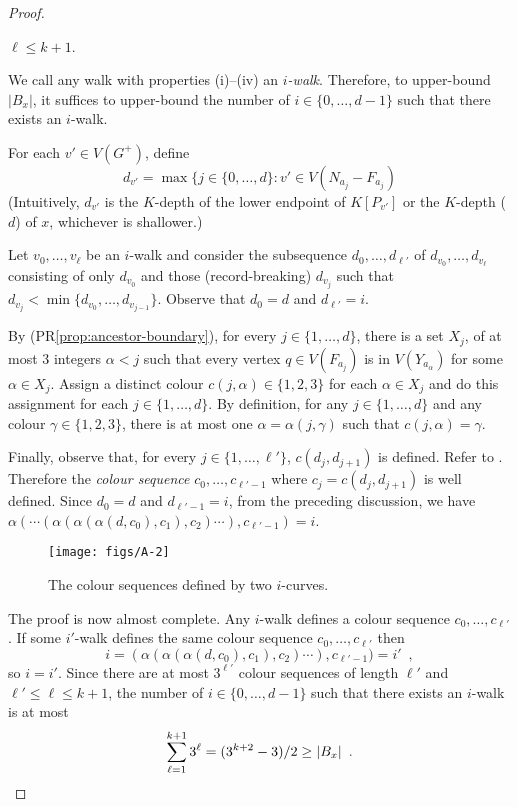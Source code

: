 \documentclass{patmorin}
\renewcommand{\propref}[1]{(PR\ref{prop:#1})}
\begin{document}
\begin{proof}
\begin{compactenum}[(i)]
    \item $\ell\le k+1$.
  \end{compactenum}
  We call any walk with properties (i)--(iv) an \emph{$i$-walk}. Therefore, to upper-bound $|B_x|$, it suffices to upper-bound the number of $i\in\{0,\ldots,d-1\}$ such that there exists an $i$-walk.
  
  For each $v'\in V(G^+)$, define
  \[  
      d_{v'}=\max\{j\in\{0,\ldots,d\} : v'\in V(N_{a_j}-F_{a_j})
  \]
  (Intuitively, $d_{v'}$ is the $K$-depth of the lower endpoint of $K[P_{v'}]$ or the $K$-depth ($d$) of $x$, whichever is shallower.)
     
  Let $v_0,\ldots,v_\ell$ be an $i$-walk and consider the subsequence $d_0,\ldots,d_{\ell'}$ of $d_{v_0},\ldots,d_{v_\ell}$ consisting of only $d_{v_0}$ and those (record-breaking) $d_{v_j}$ such that $d_{v_j}<\min\{d_{v_0},\ldots,d_{v_{j-1}}\}$.  Observe that $d_0=d$ and $d_{\ell'}=i$.
  
  By \propref{ancestor-boundary}, for every $j\in\{1,\ldots,d\}$, there is a set $X_{j}$, of at most 3 integers $\alpha < j$ such that every vertex $q\in V(F_{a_j})$ is in $V(Y_{a_{\alpha}})$ for some $\alpha\in X_j$.
  Assign a distinct colour $c(j,\alpha)\in\{1,2,3\}$ for each $\alpha\in X_j$ and do this assignment for each $j\in\{1,\ldots,d\}$.  By definition, for any $j\in\{1,\ldots,d\}$ and any colour $\gamma\in\{1,2,3\}$, there is at most one $\alpha=\alpha(j,\gamma)$ such that $c(j,\alpha)=\gamma$.
  
  Finally, observe that, for every $j\in\{1,\ldots,\ell'\}$,  $c(d_j,d_{j+1})$ is defined.  Refer to . Therefore the \emph{colour sequence} $c_0,\ldots,c_{\ell'-1}$ where $c_j=c(d_j,d_{j+1})$ is well defined.  Since $d_0=d$ and $d_{\ell'-1}=i$, from the preceding discussion, we have $\alpha(\cdots (\alpha(\alpha(\alpha(d,c_0),c_1),c_2)\cdots),c_{\ell'-1}) = i$.

  \begin{figure}
    \begin{center}
        \texttt{[image: figs/A-2]}
    \end{center}
    \caption{The colour sequences defined by two $i$-curves.}
  \end{figure}

  The proof is now almost complete.  Any $i$-walk defines a colour sequence $c_0,\ldots,c_{\ell'}$.  If some $i'$-walk defines the same colour sequence $c_0,\ldots,c_{\ell'}$ then
  \[
        i = (\alpha(\alpha(\alpha(d,c_0),c_1),c_2)\cdots),c_{\ell'-1}) = i' \enspace ,
  \]
  so $i=i'$.  Since there are at most $3^{\ell'}$ colour sequences of length $\ell'$ and $\ell'\le \ell \le k+1$, the number of $i\in\{0,\ldots,d-1\}$ such that there exists an $i$-walk is at most
  \[
     \sum_{\ell=1}^{k+1} 3^\ell = (3^{k+2}-3)/2 \ge |B_x| \eqlabel{bag-size} \enspace . \qedhere
  \]
\end{proof}
\end{document}
